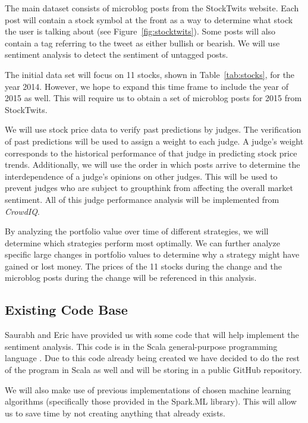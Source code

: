 The main dataset consists of microblog posts from the StockTwits website.
Each post will contain a stock symbol at the front as a way to determine what stock the user is talking about (see Figure~\ref{fig:stocktwits}).
Some posts will also contain a tag referring to the tweet as either bullish or bearish.
We will use sentiment analysis to detect the sentiment of untagged posts.

The initial data set will focus on 11 stocks, shown in Table~\ref{tab:stocks}, for the year 2014.
However, we hope to expand this time frame to include the year of 2015 as well.
This will require us to obtain a set of microblog posts for 2015 from StockTwits.

We will use stock price data to verify past predictions by judges.
The verification of past predictions will be used to assign a weight to each judge.
A judge's weight corresponds to the historical performance of that judge in predicting stock price trends.
Additionally, we will use the order in which posts arrive to determine the interdependence of a judge's opinions on other judges.
This will be used to prevent judges who are subject to groupthink from affecting the overall market sentiment.
All of this judge performance analysis will be implemented from \textit{CrowdIQ}.

By analyzing the portfolio value over time of different strategies, we will determine which strategies perform most optimally.
We can further analyze specific large changes in portfolio values to determine why a strategy might have gained or lost money.
The prices of the 11 stocks during the change and the microblog posts during the change will be referenced in this analysis.

\subsection{Existing Code Base}

Saurabh and Eric have provided us with some code that will help implement the sentiment analysis.
This code is in the Scala general-purpose programming language \cite{scala}.
Due to this code already being created we have decided to do the rest of the program in Scala as well and will be storing in a public GitHub repository.

We will also make use of previous implementations of chosen machine learning algorithms (specifically those provided in the Spark.ML library).
This will allow us to save time by not creating anything that already exists.

